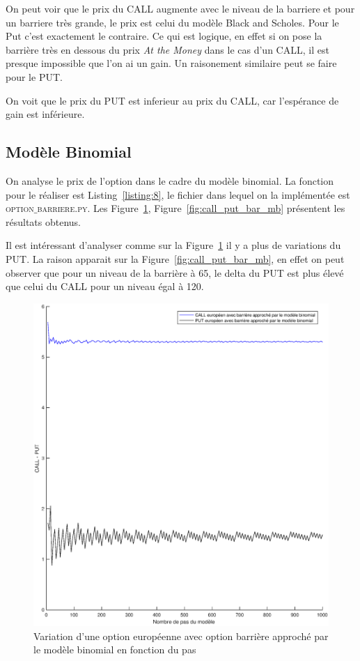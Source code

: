 On peut voir que le prix du CALL augmente avec le niveau de la barriere et pour un barriere très grande, le prix est celui du modèle Black and Scholes. Pour le Put c'est exactement le contraire. Ce qui est logique, en effet si on pose la barrière très en dessous du prix \emph{At the Money} dans le cas d'un CALL, il est presque impossible que l'on ai un gain. Un raisonement similaire peut se faire pour le PUT.

On voit que le prix du PUT est inferieur au prix du CALL, car l'espérance de gain est inférieure.

\newpage

\subsection{Modèle Binomial} %
\label{sub:modele_binomial}

On analyse le prix de l'option dans le cadre du modèle binomial. La fonction pour le réaliser est Listing~\ref{listing:8}, le fichier dans lequel on la implémentée est \textsc{option$\_$barriere.py}. Les Figure~\ref{fig:call_put_bar_mb_prof}, Figure~\ref{fig:call_put_bar_mb} présentent les résultats obtenus.


Il est intéressant d'analyser comme sur la Figure~\ref{fig:call_put_bar_mb_prof} il y a plus de variations du PUT. La raison apparait sur la Figure~\ref{fig:call_put_bar_mb}, en effet on peut observer que pour un niveau de la barrière à 65, le delta du PUT est plus élevé que celui du CALL pour un niveau égal à 120.

\begin{figure}[H]
\centering
\includegraphics[scale=0.5]{./img/CALL_PUT_BAR_MB_PROFONDEUR.eps}
\caption{Variation d'une option européenne avec option barrière approché par le modèle binomial en fonction du pas}
\label{fig:call_put_bar_mb_prof}
\end{figure}

